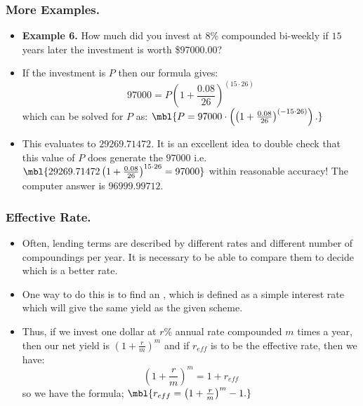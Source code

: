 
\begin{frame}%
  \frametitle{ More Examples.}
  \begin{itemize}%

\item {\bf Example 6.}
How much did you invest at $8$\% compounded bi-weekly if $15$ years
later the investment is worth \$$97000.00$?

\item If the investment is $P$ then our formula gives:
$$97000 = P\left(1+\frac{0.08}{26}\right)^{(15\cdot 26)} $$
which can be solved for $P$ as:
$\mbl{P = 97000\cdot \left(\left(1+\frac{0.08}{26}\right)^{(-15\cdot 26)}\right).}$
\item
This evaluates to $29269.71472$. It is an excellent idea to double check that
this value of $P$ does generate the $97000$ i.e.
$\mbl{29269.71472\left(1+\frac{0.08}{26}\right)^{15\cdot 26} = 97000}$
within reasonable accuracy! The computer answer is $96999.99712$.

\end{itemize}
\end{frame}


\begin{frame}%
  \frametitle{Effective Rate.}
  \begin{itemize}%
\item  Often, lending terms are described by different rates and
different number of compoundings per year. It is necessary to be able to
compare them to decide which is a better rate.

\item One way to do this is to find an ,
which is defined as a simple interest rate which will give the same
yield as the given scheme.

\item Thus, if we invest one dollar at $r$\% annual rate compounded $m$
times a year, then our net yield is $(1+\frac{r}{m})^m$ and if $r_{eff}$
is to be the effective rate, then we have:
$$\left(1+\frac{r}{m}\right)^m = 1+r_{eff} $$
so we have the formula;
$\mbl{r_{eff} = \left(1+\frac{r}{m}\right)^m -1.}$


\end{itemize}
\end{frame}

